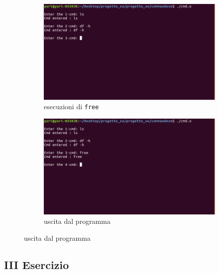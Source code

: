 \begin{figure}
\centering
\begin{subfigure}[b]{0.8\textwidth}
\includegraphics[width=\textwidth]{screencommand/3}
\caption{esecuzioni di \texttt{free}}
\end{subfigure}
\begin{subfigure}[b]{0.8\textwidth}
\includegraphics[width=\textwidth]{screencommand/4}
\caption{uscita dal programma}
\end{subfigure}
\end{figure}

\newpage
\subsection{III Esercizio}

